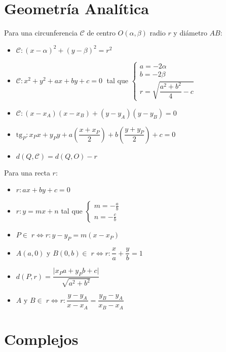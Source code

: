 \documentclass{article}
\begin{document}
\newpage

\section*{Geometría Analítica}

Para una circunferencia $\mathscr{C}$ de centro $O (\alpha , \beta)$ radio $r$ y diámetro $AB$:

\begin{itemize}
    \item $\mathscr{C} : (x-\alpha )^{2}+(y-\beta )^{2}=r^{2}$
    \item $\mathscr{C} : x^2 + y^2 + ax + by + c = 0 \;$ tal que $\begin{cases} a = -2\alpha \\ b = -2\beta \\ r = \sqrt{\dfrac{a^2+b^2}{4} - c}\end{cases}$
    \item $\mathscr{C} : (x-x_{A})(x-x_{B})+(y-y_{A})(y-y_{B})=0$
    \item $\text{tg}_P : x_P x + y_P y + a\left(\dfrac{x+x_P}{2}\right) + b\left(\dfrac{y+y_P}{2}\right) + c = 0$
    \item $d(Q,\mathscr{C}) = d(Q,O)-r$
\end{itemize}


Para una recta $r$:

\begin{itemize}
    \item $r : ax + by + c = 0$
    \item $r : y = mx + n$ tal que $\begin{cases} m = -\frac{a}{b} \\ n = -\frac{c}{b}\end{cases}$
    \item $P \in \; r \Longleftrightarrow r : y - y_P = m (x - x_P)$
    \item $A(a,0) \text{ y } B(0,b) \in \; r \Longleftrightarrow r : \dfrac{x}{a} + \dfrac{y}{b} = 1$
    \item $d(P,r) = \dfrac{\lvert x_Pa + y_Pb + c \rvert}{\sqrt{a^2 + b^2}}$
    \item $A \text{ y } B \in \; r \Longleftrightarrow r : \dfrac{y-y_A}{x-x_A} = \dfrac{y_B-y_A}{x_B-x_A}$
\end{itemize}

\newpage

\section*{Complejos}
\end{document}
